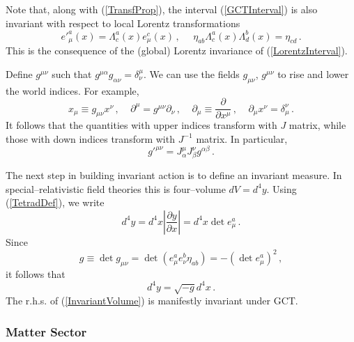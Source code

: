 \documentclass[12pt]{article}
\begin{document}
Note that, along with (\ref{TransfProp}), the interval (\ref{GCTInterval}) is also invariant with respect to local Lorentz transformations
\begin{equation}
e'^a_\mu(x)=\Lambda^a_c(x)e^c_\mu(x) \,, ~~~~~~ \eta_{ab}\Lambda^a_c(x)\Lambda^b_d(x)=\eta_{cd} \,.
\end{equation}
This is the consequence of the (global) Lorentz invariance of (\ref{LorentzInterval}).

Define $g^{\mu\nu}$ such that $g^{\mu\alpha}g_{\alpha\nu}=\delta^\mu_\nu$. We can use the fields $g_{\mu\nu}$, $g^{\mu\nu}$ to rise and lower the world indices. For example,
\begin{equation}
x_\mu\equiv g_{\mu\nu}x^\nu \,, ~~~~~ \partial^\mu=g^{\mu\nu}\partial_\nu \,, ~~~~~ \partial_\mu\equiv \dfrac{\partial}{\partial x^\mu} \,, ~~~~~\partial_\mu x^\nu=\delta^\nu_\mu \,.
\end{equation}
It follows that the quantities with upper indices transform with $J$ matrix, while those with down indices transform with $J^{-1}$ matrix. In particular,
\begin{equation}
g'^{\mu\nu}=J^\mu_\alpha J^\nu_\beta g^{\alpha\beta} \,.
\end{equation}

The next step in building invariant action is to define an invariant measure. In special--relativistic field theories this is four--volume $dV=d^4y$. Using (\ref{TetradDef}), we write
\begin{equation}
d^4y=d^4x \left\vert\dfrac{\partial y}{\partial x}\right\vert=d^4x\det e^a_\mu \,.
\end{equation}
Since
\begin{equation}
g\equiv\det g_{\mu\nu}=\det (e^a_\mu e^b_\nu\eta_{ab})=-(\det e^a_\mu)^2 \,,
\end{equation}
it follows that
\begin{equation}\label{InvariantVolume}
d^4y=\sqrt{-g}d^4x \,.
\end{equation}
The r.h.s. of (\ref{InvariantVolume}) is manifestly invariant under GCT.

\subsubsection{Matter Sector}
\end{document}
